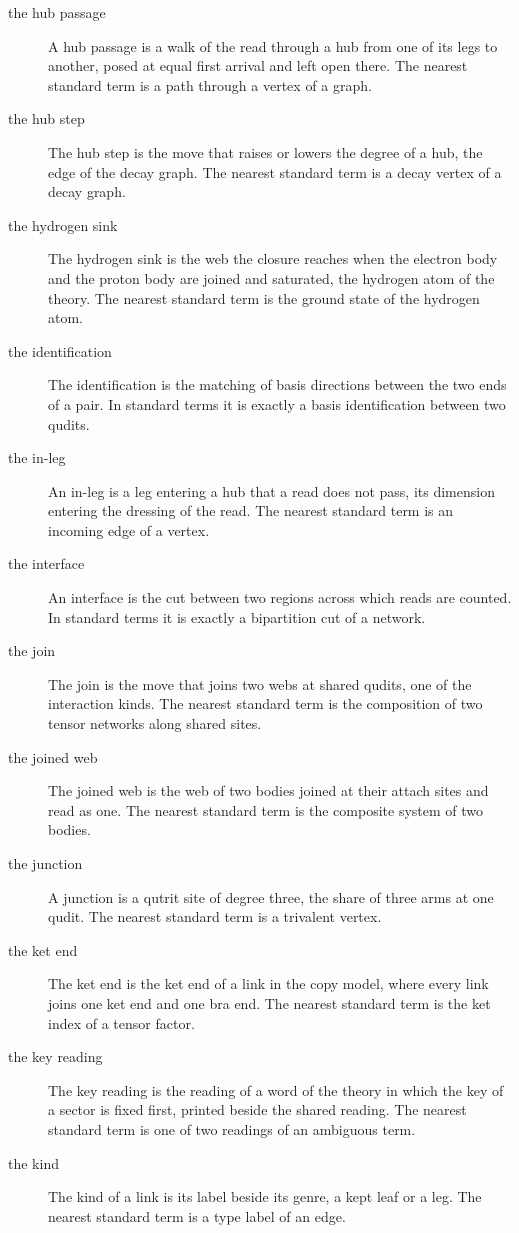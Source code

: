 \begin{description}
\item[the hub passage] A hub passage is a walk of the read through a hub from one of its legs to another, posed at equal first arrival and left open there. The nearest standard term is a path through a vertex of a graph.
\item[the hub step] The hub step is the move that raises or lowers the degree of a hub, the edge of the decay graph. The nearest standard term is a decay vertex of a decay graph.
\item[the hydrogen sink] The hydrogen sink is the web the closure reaches when the electron body and the proton body are joined and saturated, the hydrogen atom of the theory. The nearest standard term is the ground state of the hydrogen atom.
\item[the identification] The identification is the matching of basis directions between the two ends of a pair. In standard terms it is exactly a basis identification between two qudits.
\item[the in-leg] An in-leg is a leg entering a hub that a read does not pass, its dimension entering the dressing of the read. The nearest standard term is an incoming edge of a vertex.
\item[the interface] An interface is the cut between two regions across which reads are counted. In standard terms it is exactly a bipartition cut of a network.
\item[the join] The join is the move that joins two webs at shared qudits, one of the interaction kinds. The nearest standard term is the composition of two tensor networks along shared sites.
\item[the joined web] The joined web is the web of two bodies joined at their attach sites and read as one. The nearest standard term is the composite system of two bodies.
\item[the junction] A junction is a qutrit site of degree three, the share of three arms at one qudit. The nearest standard term is a trivalent vertex.
\item[the ket end] The ket end is the ket end of a link in the copy model, where every link joins one ket end and one bra end. The nearest standard term is the ket index of a tensor factor.
\item[the key reading] The key reading is the reading of a word of the theory in which the key of a sector is fixed first, printed beside the shared reading. The nearest standard term is one of two readings of an ambiguous term.
\item[the kind] The kind of a link is its label beside its genre, a kept leaf or a leg. The nearest standard term is a type label of an edge.

\end{description}
